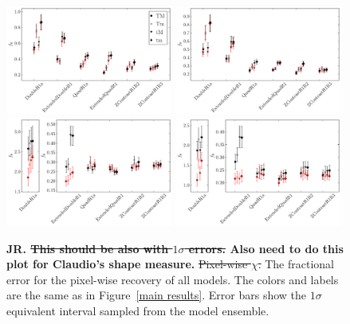 \documentclass[galley,usenatbib]{mn2e}
\newcommand{\figref}[1] {Figure~\ref{#1}}
\begin{document}
\begin{figure}
\includegraphics[width=0.49\textwidth]{AAferror-1sig.pdf}
\includegraphics[width=0.49\textwidth]{BBferror-1sig.pdf}\\
\includegraphics[width=0.49\textwidth]{ACferror-1sig.pdf}
\includegraphics[width=0.49\textwidth]{BCferror-1sig.pdf}
\caption{ {\bf JR. \sout{ This should be also with $1\sigma$ errors.} Also need to do this plot for Claudio's shape measure.} \sout{Pixel-wise $\chi$.}
The fractional error for the pixel-wise recovery of all models. The colors and labels are the same as in \figref{main results}. Error bars show the $1\sigma$ equivalent interval sampled from the model ensemble.}
\label{main results pixel-wise}
\end{figure}
\end{document}
